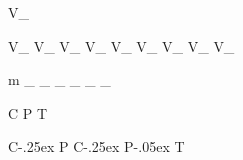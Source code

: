 
\newmathsymbol{\SigEff}{\varepsilon_{\Sig}}
\newmathsymbol{\BkgEff}{\varepsilon_{\Bkg}}

\newcommand{\crosssect}[1]{\ensuremath{\sigma\left(#1\right)}\xspace}
\newcommand{\crosssectinline}[1]{\ensuremath{\sigma(#1)}\xspace}


\newmathsymbol{\VCKM}             {V_{}}

\newmathsymbol{\Vud}              {V_{\uquark\dquark}}
\newmathsymbol{\Vcd}              {V_{\cquark\dquark}}
\newmathsymbol{\Vtd}              {V_{\tquark\dquark}}
\newmathsymbol{\Vus}              {V_{\uquark\squark}}
\newmathsymbol{\Vcs}              {V_{\cquark\squark}}
\newmathsymbol{\Vts}              {V_{\tquark\squark}}
\newmathsymbol{\Vub}              {V_{\uquark\bquark}}
\newmathsymbol{\Vcb}              {V_{\cquark\bquark}}
\newmathsymbol{\Vtb}              {V_{\tquark\bquark}}

\newmathsymbol{\DM}       {\Delta m}
\newmathsymbol{\DMs}      {\DM_{\squark}}
\newmathsymbol{\DMd}      {\DM_{\dquark}}
\newmathsymbol{\DG}       {\Delta\mathit{\Gamma}}
\newmathsymbol{\DGs}      {\DG_{\squark}}
\newmathsymbol{\DGd}      {\DG_{\dquark}}
\newmathsymbol{\Gs}       {\mathit{\Gamma}_{\squark}}
\newmathsymbol{\Gd}       {\mathit{\Gamma}_{\dquark}}


\newmathsymbol{\CSym}               {C}
\newmathsymbol{\PSym}               {P}
\newmathsymbol{\TSym}               {T}

\newmathsymbol{\CP}               {C\kern-.25ex P}
\newmathsymbol{\CPHyperref}       {\texorpdfstring{\CP}{CP}}
\newmathsymbol{\CPbfsf}           {\mathbfsfit{\CP}}
\newmathsymbol{\CPbfsfHyperref}   {\texorpdfstring{\CPbfsf}{CP}}
\newmathsymbol{\CPT}              {C\kern-.25ex P\kern-.05ex T}
\newmathsymbol{\CPAsymmetry}      {\Asym{\CP}{}}


